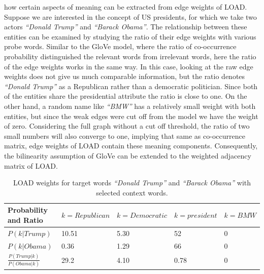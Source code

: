 how certain aspects of meaning can be extracted from edge weights of LOAD.  Suppose we are interested in the concept of US presidents, for which we take two actors \emph{``Donald Trump''} and \emph{``Barack Obama''}. The relationship between these entities can be examined by studying the ratio of their edge weights with various probe words. Similar to the GloVe model, where the ratio of co-occurrence probability distinguished the relevant words from irrelevant words, here the ratio of the edge weights works in the same way. In this case, looking at the raw edge weights does not give us much comparable information, but the ratio denotes \emph{``Donald Trump''} as a Republican rather than a democratic politician. Since both of the entities share the presidential attribute the ratio is close to one. On the other hand, a random name like \emph{``BMW''} has a relatively small weight with both entities, but since the weak edges were cut off from the model we have the weight of zero. Considering the full graph without a cut off threshold, the ratio of two small numbers will also converge to one, implying that same as co-occurrence matrix, edge weights of LOAD contain these meaning components. Consequently, the bilinearity assumption of GloVe can be extended to the weighted adjacency matrix of LOAD. 
\begin{table}[]
\centering

\begin{tabular}{@{}l|l|l|l|l@{}}
\toprule
Probability and Ratio&  $k=Republican$& $k=Democratic$ & $k=president$ &$k= BMW$  \\ \midrule
 $P(k|Trump)$& {\color[HTML]{CB0000}10.51} &  {\color[HTML]{329A9D}5.30} & {\color[HTML]{CB0000}52} & {\color[HTML]{329A9D}0} \\\midrule
  $P(k|Obama)$&{\color[HTML]{329A9D}0.36}  & {\color[HTML]{CB0000}1.29} &  {\color[HTML]{CB0000}66}&{\color[HTML]{329A9D}0}  \\\midrule
 $\frac { P(Trump|k) }{ P(Obama|k) } $& {\color[HTML]{CB0000}29.2} &  {\color[HTML]{329A9D}4.10}&  0.78 &    0  \\\midrule
\end{tabular}%

\caption{LOAD weights for target words \emph{``Donald Trump''} and \emph{``Barack Obama''} with selected context words. }
\label{table:tab_2}
\end{table}
\label{sec:components_load}

